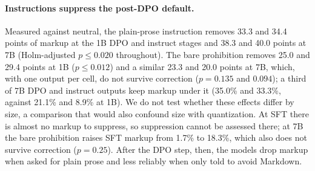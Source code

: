 \documentclass[acmsmall,screen,review,anonymous]{acmart}
\begin{document}
\paragraph{Instructions suppress the post-DPO default.} Measured against neutral, the plain-prose instruction removes 33.3 and 34.4 points of markup at the 1B DPO and instruct stages and 38.3 and 40.0 points at 7B (Holm-adjusted $p\le0.020$ throughout). The bare prohibition removes 25.0 and 29.4 points at 1B ($p\le0.012$) and a similar 23.3 and 20.0 points at 7B, which, with one output per cell, do not survive correction ($p=0.135$ and $0.094$); a third of 7B DPO and instruct outputs keep markup under it (35.0\% and 33.3\%, against 21.1\% and 8.9\% at 1B). We do not test whether these effects differ by size, a comparison that would also confound size with quantization. At SFT there is almost no markup to suppress, so suppression cannot be assessed there; at 7B the bare prohibition raises SFT markup from 1.7\% to 18.3\%, which also does not survive correction ($p=0.25$). After the DPO step, then, the models drop markup when asked for plain prose and less reliably when only told to avoid Markdown.
\end{document}
